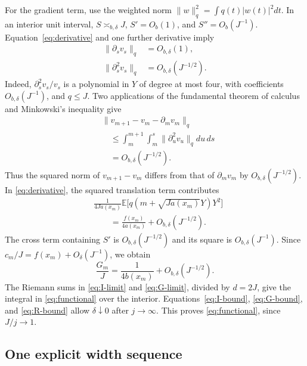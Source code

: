 \documentclass[aps,pra,reprint,superscriptaddress]{revtex4-2}
\theoremstyle{remark}
\newcommand{\E}{\mathbb E}
\newcommand{\norm}[1]{\lVert#1\rVert}
\begin{document}
For the gradient term, use the weighted norm
$\norm w_q^2=\int q(t)|w(t)|^2dt$. In an interior unit interval,
$S\asymp_{b,\delta}J$, $S'=O_b(1)$, and $S''=O_b(J^{-1})$.
Equation~\eqref{eq:derivative} and one further derivative imply
\begin{equation}
\begin{aligned}
\norm{\partial_sv_s}_q&=O_{b,\delta}(1),\\
\norm{\partial_s^2v_s}_q&=O_{b,\delta}(J^{-1/2}).
\end{aligned}
\label{eq:H2}
\end{equation}
Indeed, $\partial_s^2v_s/v_s$ is a polynomial in $Y$ of degree at
most four, with coefficients $O_{b,\delta}(J^{-1})$, and $q\leq J$.
Two applications of the fundamental theorem of calculus and
Minkowski's inequality give
\begin{equation}
\begin{aligned}
&\norm{v_{m+1}-v_m-\partial_mv_m}_q\\
&\quad\leq\int_m^{m+1}\int_m^s
\norm{\partial_u^2v_u}_qdu\,ds\\
&\quad=O_{b,\delta}(J^{-1/2}).
\end{aligned}
\label{eq:finite-diff}
\end{equation}
Thus the squared norm of $v_{m+1}-v_m$ differs from that of
$\partial_mv_m$ by $O_{b,\delta}(J^{-1/2})$.
In \eqref{eq:derivative}, the squared translation term contributes
\begin{align*}
 &\frac1{4Ja(x_m)}\E\bigl[q(m+\sqrt{Ja(x_m)}Y)Y^2\bigr]\\
 &\qquad=\frac{f(x_m)}{4a(x_m)}+O_{b,\delta}(J^{-1/2}).
\end{align*}
The cross term containing $S'$ is $O_{b,\delta}(J^{-1/2})$ and its
square is $O_{b,\delta}(J^{-1})$. Since
$c_m/J=f(x_m)+O_\delta(J^{-1})$, we obtain
\begin{equation}
 \frac{G_m}{J}=\frac1{4b(x_m)}+O_{b,\delta}(J^{-1/2}).
 \label{eq:G-limit}
\end{equation}
The Riemann sums in \eqref{eq:I-limit} and \eqref{eq:G-limit},
divided by $d=2J$, give the integral in \eqref{eq:functional} over
the interior. Equations~\eqref{eq:I-bound}, \eqref{eq:G-bound}, and
\eqref{eq:R-bound} allow $\delta\downarrow0$ after $j\to\infty$.
This proves \eqref{eq:functional}, since $J/j\to1$.

\subsection{One explicit width sequence}
\end{document}

